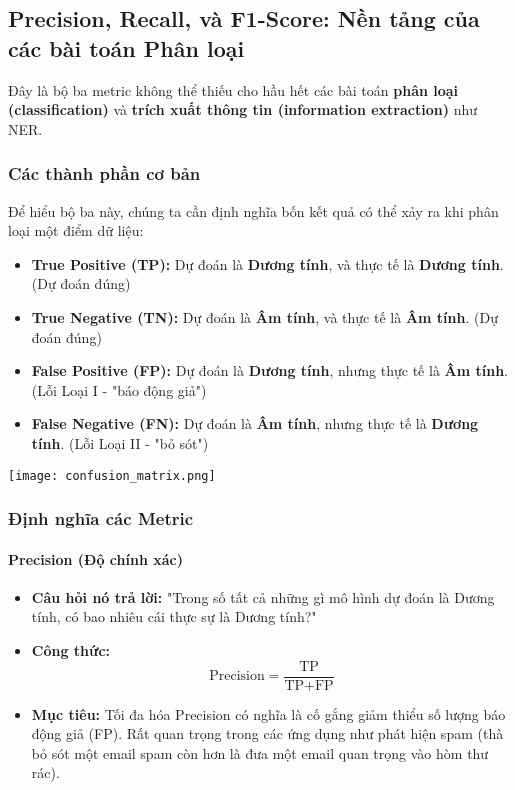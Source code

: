 \subsection{Precision, Recall, và F1-Score: Nền tảng của các bài toán Phân loại}
\label{ssec:f1_score}
Đây là bộ ba metric không thể thiếu cho hầu hết các bài toán \textbf{phân loại (classification)} và \textbf{trích xuất thông tin (information extraction)} như NER.

\subsubsection{Các thành phần cơ bản}
Để hiểu bộ ba này, chúng ta cần định nghĩa bốn kết quả có thể xảy ra khi phân loại một điểm dữ liệu:
\begin{itemize}
    \item \textbf{True Positive (TP):} Dự đoán là \textbf{Dương tính}, và thực tế là \textbf{Dương tính}. (Dự đoán đúng)
    \item \textbf{True Negative (TN):} Dự đoán là \textbf{Âm tính}, và thực tế là \textbf{Âm tính}. (Dự đoán đúng)
    \item \textbf{False Positive (FP):} Dự đoán là \textbf{Dương tính}, nhưng thực tế là \textbf{Âm tính}. (Lỗi Loại I - "báo động giả")
    \item \textbf{False Negative (FN):} Dự đoán là \textbf{Âm tính}, nhưng thực tế là \textbf{Dương tính}. (Lỗi Loại II - "bỏ sót")
\end{itemize}

\begin{center}
    \texttt{[image: confusion\_matrix.png]}
    \label{fig:confusion_matrix}
\end{center}

\subsubsection{Định nghĩa các Metric}
\paragraph{Precision (Độ chính xác)}
\begin{itemize}
    \item \textbf{Câu hỏi nó trả lời:} "Trong số tất cả những gì mô hình dự đoán là Dương tính, có bao nhiêu cái thực sự là Dương tính?"
    \item \textbf{Công thức:}
        $$ \text{Precision} = \frac{\text{TP}}{\text{TP} + \text{FP}} $$
    \item \textbf{Mục tiêu:} Tối đa hóa Precision có nghĩa là cố gắng giảm thiểu số lượng báo động giả (FP). Rất quan trọng trong các ứng dụng như phát hiện spam (thà bỏ sót một email spam còn hơn là đưa một email quan trọng vào hòm thư rác).
\end{itemize}

